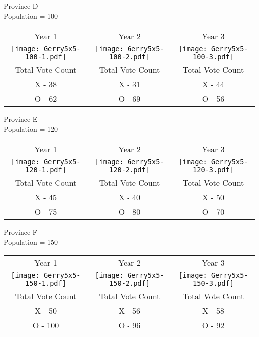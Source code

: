 \documentclass{article}
\begin{document}
\begin{flushleft}
Province D\\
Population = 100
\begin{tabular}{c c c }

Year 1 & Year 2 & Year 3 \\
 \texttt{[image: Gerry5x5-100-1.pdf]} &  \texttt{[image: Gerry5x5-100-2.pdf]} &  \texttt{[image: Gerry5x5-100-3.pdf]}\\
 Total Vote Count &  Total Vote Count &  Total Vote Count\\
 X -  38& X - 31 & X  - 44\\
 O - 62 & O - 69 & O - 56
 \end{tabular}


Province E\\
Population = 120
\begin{tabular}{c c c }

Year 1 & Year 2 & Year 3 \\
 \texttt{[image: Gerry5x5-120-1.pdf]} &  \texttt{[image: Gerry5x5-120-2.pdf]} &  \texttt{[image: Gerry5x5-120-3.pdf]}\\
 Total Vote Count &  Total Vote Count &  Total Vote Count\\
 X -  45& X - 40 & X  - 50\\
 O - 75 & O - 80 & O - 70
 \end{tabular}


Province F\\
Population = 150
\begin{tabular}{c c c }

Year 1 & Year 2 & Year 3 \\
 \texttt{[image: Gerry5x5-150-1.pdf]} &  \texttt{[image: Gerry5x5-150-2.pdf]} &  \texttt{[image: Gerry5x5-150-3.pdf]}\\
 Total Vote Count &  Total Vote Count &  Total Vote Count\\
 X -  50& X - 56 & X  - 58\\
 O - 100 & O - 96 & O - 92
 \end{tabular}
\end{flushleft}
\end{document}
